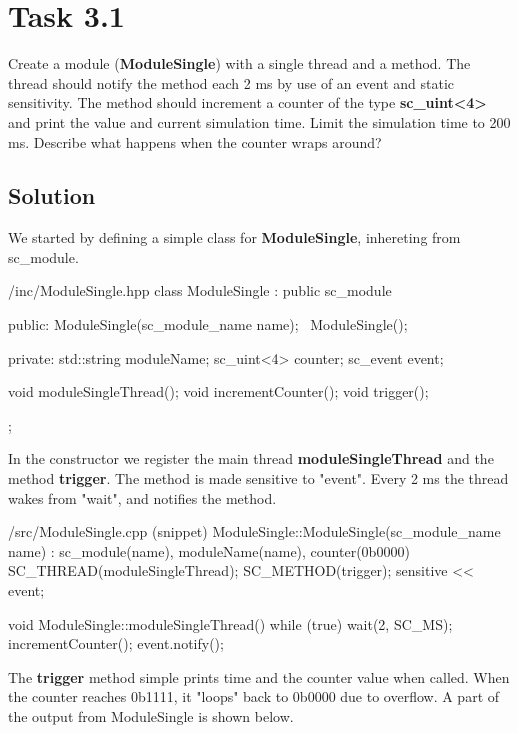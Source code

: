 \documentclass[../main.tex]{subfiles}
\begin{document}
\section*{Task 3.1}

Create a module (\textbf{ModuleSingle}) with a single thread and a method. The thread should notify the method each 2 ms by use of an event and static sensitivity. The method should increment a counter of the type \textbf{sc\_uint<4>} and print the value and current simulation time. Limit the simulation time to 200 ms. Describe what happens when the counter wraps around?

\subsection*{Solution}

We started by defining a simple class for \textbf{ModuleSingle}, inhereting from sc\_module.

\begin{myminted}{/inc/ModuleSingle.hpp}
class ModuleSingle : public sc_module {
public:
    ModuleSingle(sc_module_name name);
    ~ModuleSingle();

private:
    std::string moduleName;
    sc_uint<4> counter;
    sc_event event;

    void moduleSingleThread();
    void incrementCounter();
    void trigger();
};
\end{myminted}

In the constructor we register the main thread \textbf{moduleSingleThread} and the method \textbf{trigger}. The method is made sensitive to "event". Every 2 ms the thread wakes from "wait", and notifies the method.

\begin{myminted}{/src/ModuleSingle.cpp (snippet)}
ModuleSingle::ModuleSingle(sc_module_name name) 
    : sc_module(name), moduleName(name), counter(0b0000)
{
    SC_THREAD(moduleSingleThread);
    SC_METHOD(trigger);
    sensitive << event;
}

void ModuleSingle::moduleSingleThread() {
    while (true) {
        wait(2, SC_MS); 
        incrementCounter();
        event.notify();
    }
}
\end{myminted}

\newpage

The \textbf{trigger} method simple prints time and the counter value when called. When the counter reaches 0b1111, it "loops" back to 0b0000 due to overflow. A part of the output from ModuleSingle is shown below.
\end{document}
